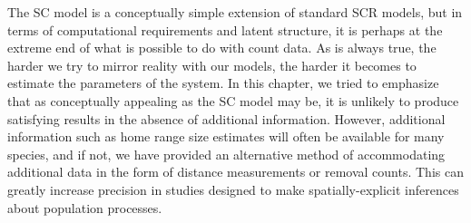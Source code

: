 The SC model is a conceptually simple extension of standard SCR
models, but in terms of computational requirements and latent
structure, it is perhaps at the extreme end of what is possible to do
with count data. As is always true, the harder we try to mirror
reality with our models, the harder it becomes to estimate the
parameters of the system. In this chapter, we tried to emphasize that
as conceptually appealing as the SC model may be, it is unlikely to
produce satisfying results in the absence of additional
information. However, additional information such as home range size
estimates will often be available
for many species, and if not, we have provided an alternative method of
accommodating additional data in the form of distance measurements or
removal counts. This can greatly increase precision in studies
designed to make spatially-explicit inferences about population
processes.

